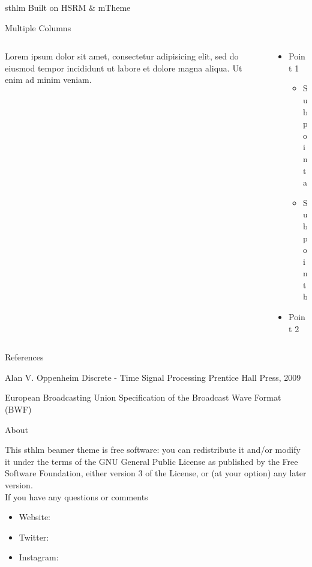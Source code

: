 \documentclass[newPxFont]{beamer}
\begin{document}
\begin{frame}[c]{sthlm Built on HSRM \& mTheme}

\begin{frame}{Multiple Columns}
\begin{columns}
\begin{column}{.48\linewidth}
		Lorem ipsum dolor sit amet, consectetur adipisicing elit, sed do eiusmod
		tempor incididunt ut labore et dolore magna aliqua. Ut enim ad minim veniam.
\end{column}
\begin{column}{.48\linewidth}
		\begin{itemize}
        	\item Point 1
			\begin{itemize}
				\item Sub point a
				\item Sub point b
			\end{itemize}
        	\item Point 2
		\end{itemize}
	\end{column}
	\end{columns}
\end{frame}

\begin{frame}{References}
	\begin{thebibliography}{10}

	\beamertemplatebookbibitems
	Alan V. Oppenheim
	\newblock Discrete - Time Signal Processing
	\newblock Prentice Hall Press, 2009

	\beamertemplatearticlebibitems
	European Broadcasting Union
	\newblock Specification of the Broadcast Wave Format (BWF)

  \end{thebibliography}
\end{frame}

%
%

\begin{frame}{About}

This sthlm beamer theme is free software: you can redistribute it and/or modify
it under the terms of the GNU General Public License as published by
the Free Software Foundation, either version 3 of the License, or
(at your option) any later version.\\
\vspace{1cm}
If you have any questions or comments
\begin{itemize}
	\item Website: 
	\item Twitter: 
	\item Instagram: 
\end{itemize}
\end{frame}


\end{frame}
\end{document}
